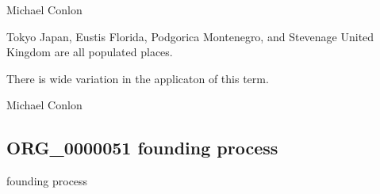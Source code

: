 \documentclass[letterpaper,10pt,english]{sphinxmanual}
\begin{document}
\begin{sphinxShadowBox}

\sphinxAtStartPar
Michael Conlon 
\end{sphinxShadowBox}

\begin{sphinxShadowBox}

\sphinxAtStartPar
Tokyo Japan, Eustis Florida, Podgorica Montenegro, and Stevenage United Kingdom are all populated places.
\end{sphinxShadowBox}

\begin{sphinxShadowBox}

\sphinxAtStartPar
There is wide variation in the applicaton of this term.
\end{sphinxShadowBox}

\begin{sphinxShadowBox}

\sphinxAtStartPar
{}
\end{sphinxShadowBox}

\begin{sphinxShadowBox}

\sphinxAtStartPar
Michael Conlon 
\end{sphinxShadowBox}
\begin{quote}

\ignorespaces \end{quote}


\subsection{ORG\_0000051 \sphinxhyphen{} founding process}
\label{\detokenize{doc-ORG_0000051:org-0000051-founding-process}}\label{\detokenize{doc-ORG_0000051:index-0}}\label{\detokenize{doc-ORG_0000051::doc}}
\begin{sphinxShadowBox}

\sphinxAtStartPar
founding process
\end{sphinxShadowBox}
\end{document}
